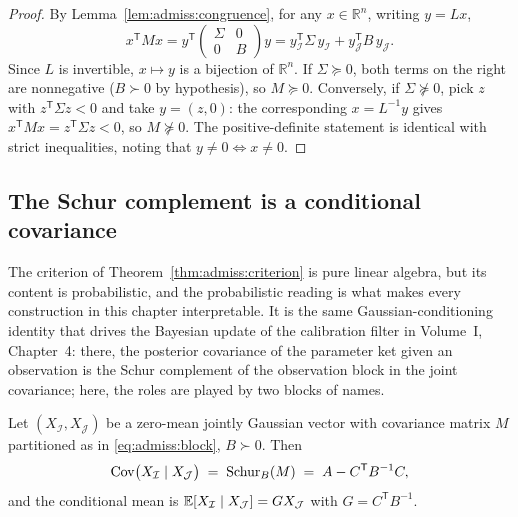 \begin{proof}
By Lemma~\ref{lem:admiss:congruence}, for any $x \in \mathbb{R}^n$, writing
$y = L x$,
\[
  x^{\mathsf T} M x
  = y^{\mathsf T} \begin{pmatrix} \Sigma & 0 \\ 0 & B \end{pmatrix} y
  = y_{\mathcal I}^{\mathsf T} \Sigma\, y_{\mathcal I}
    + y_{\mathcal J}^{\mathsf T} B\, y_{\mathcal J}.
\]
Since $L$ is invertible, $x \mapsto y$ is a bijection of $\mathbb{R}^n$.
If $\Sigma \succeq 0$, both terms on the right are nonnegative
($B \succ 0$ by hypothesis), so $M \succeq 0$. Conversely, if
$\Sigma \not\succeq 0$, pick $z$ with $z^{\mathsf T} \Sigma z < 0$ and take
$y = (z, 0)$: the corresponding $x = L^{-1} y$ gives
$x^{\mathsf T} M x = z^{\mathsf T} \Sigma z < 0$, so $M \not\succeq 0$.
The positive-definite statement is identical with strict inequalities,
noting that $y \ne 0 \iff x \ne 0$.
\end{proof}

\subsection{The Schur complement is a conditional covariance}
\label{sec:admiss:conditional}

The criterion of Theorem~\ref{thm:admiss:criterion} is pure linear algebra,
but its content is probabilistic, and the probabilistic reading is what
makes every construction in this chapter interpretable. It is the same
Gaussian-conditioning identity that drives the Bayesian update of the
calibration filter in Volume~I, Chapter~4: there, the posterior covariance
of the parameter ket given an observation is the Schur complement of the
observation block in the joint covariance; here, the roles are played by
two blocks of names.

\begin{proposition}\label{prop:admiss:condcov}
Let $(X_{\mathcal I}, X_{\mathcal J})$ be a zero-mean jointly Gaussian
vector with covariance matrix $M$ partitioned as in
\eqref{eq:admiss:block}, $B \succ 0$. Then
\begin{equation}\label{eq:admiss:condcov}
  \operatorname{Cov}\bigl(X_{\mathcal I} \mid X_{\mathcal J}\bigr)
  \;=\; \mathrm{Schur}_{B}\!\left(M\right) \;=\; A - C^{\mathsf T} B^{-1} C,
\end{equation}
and the conditional mean is
$\mathbb{E}[X_{\mathcal I} \mid X_{\mathcal J}] = G X_{\mathcal J}$ with
$G = C^{\mathsf T} B^{-1}$.
\end{proposition}


